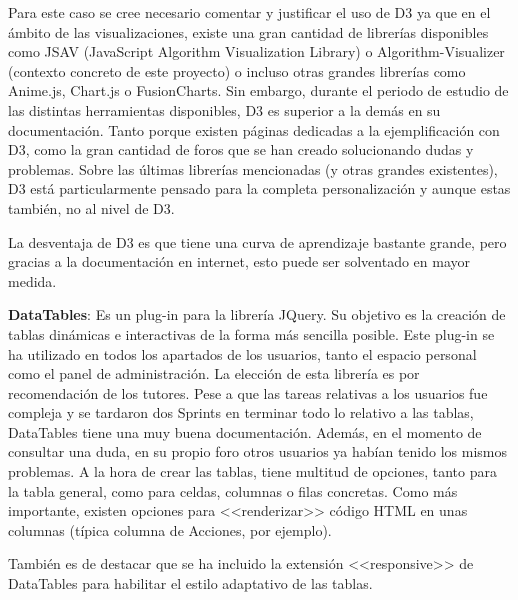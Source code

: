 Para este caso se cree necesario comentar y justificar el uso de D3 ya que en el
ámbito de las visualizaciones, existe una gran cantidad de librerías disponibles
como JSAV (JavaScript Algorithm Visualization Library) o Algorithm-Visualizer
(contexto concreto de este proyecto) o incluso otras grandes librerías como
Anime.js, Chart.js o FusionCharts. Sin embargo, durante el periodo de estudio de
las distintas herramientas disponibles, D3 es superior a la demás en su
documentación. Tanto porque existen páginas dedicadas a la ejemplificación con
D3, como la gran cantidad de foros que se han creado solucionando dudas y
problemas. Sobre las últimas librerías mencionadas (y otras grandes existentes),
D3 está particularmente pensado para la completa personalización y aunque estas
también, no al nivel de D3.

La desventaja de D3 es que tiene una curva de aprendizaje bastante grande, pero
gracias a la documentación en internet, esto puede ser solventado en mayor
medida.

\textbf{DataTables}: Es un plug-in para la librería JQuery. Su objetivo es la
creación de tablas dinámicas e interactivas de la forma más sencilla posible.
Este plug-in se ha utilizado en todos los apartados de los usuarios, tanto el
espacio personal como el panel de administración. La elección de esta librería
es por recomendación de los tutores. Pese a que las tareas relativas a los
usuarios fue compleja y se tardaron dos Sprints en terminar todo lo relativo a
las tablas, DataTables tiene una muy buena documentación. Además, en el momento
de consultar una duda, en su propio foro otros usuarios ya habían tenido los
mismos problemas. A la hora de crear las tablas, tiene multitud de opciones,
tanto para la tabla general, como para celdas, columnas o filas concretas. Como
más importante, existen opciones para <<renderizar>> código HTML en unas
columnas (típica columna de Acciones, por ejemplo).

También es de destacar que se ha incluido la extensión <<responsive>> de
DataTables para habilitar el estilo adaptativo de las tablas.
